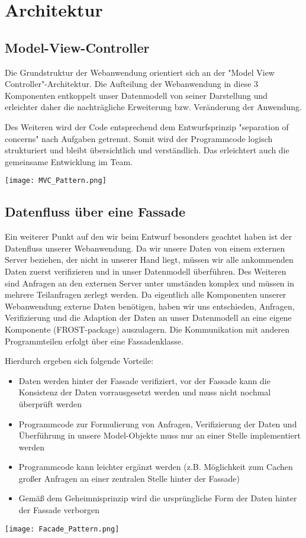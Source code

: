 \section{Architektur}

\subsection{Model-View-Controller}
Die Grundstruktur der Webanwendung orientiert sich an der "Model View Controller"-Architektur. Die Aufteilung der Webanwendung in diese 3 Komponenten entkoppelt unser Datenmodell von seiner Darstellung und erleichter daher die nachträgliche Erweiterung bzw. Veränderung der Anwendung.

Des Weiteren wird der Code entsprechend dem Entwurfsprinzip "separation of concerns" nach Aufgaben getrennt. Somit wird der Programmcode logisch strukturiert und bleibt übersichtlich und verständlich. Das erleichtert auch die gemeinsame Entwicklung im Team.

\vspace{5mm}

\texttt{[image: MVC\_Pattern.png]}

\newpage

\subsection{Datenfluss über eine Fassade}
Ein weiterer Punkt auf den wir beim Entwurf besonders geachtet haben ist der Datenfluss unserer Webanwendung. Da wir unsere Daten von einem externen Server beziehen, der nicht in unserer Hand liegt, müssen wir alle ankommenden Daten zuerst verifizieren und in unser Datenmodell überführen. Des Weiteren sind Anfragen an den externen Server unter umständen komplex und müssen in mehrere Teilanfragen zerlegt werden.
Da eigentlich alle Komponenten unserer Webanwendung externe Daten benötigen, haben wir uns entschieden, Anfragen, Verifizierung und die Adaption der Daten an unser Datenmodell an eine eigene Komponente (FROST-package) auszulagern. Die Kommunikation mit anderen Programmteilen erfolgt über eine Fassadenklasse.

Hierdurch ergeben sich folgende Vorteile:
\begin{itemize}
    \item Daten werden hinter der Fassade verifiziert, vor der Fassade kann die Konsistenz der Daten vorrausgesetzt werden und muss nicht nochmal überprüft werden
    \item Programmcode zur Formulierung von Anfragen, Verifizierung der Daten und Überführung in unsere Model-Objekte muss nur an einer Stelle implementiert werden
    \item Programmcode kann leichter ergänzt werden (z.B. Möglichkeit zum Cachen großer Anfragen an einer zentralen Stelle hinter der Fassade)
    \item Gemäß dem Geheimnisprinzip wird die ursprüngliche Form der Daten hinter der Fassade verborgen
\end{itemize}

\vspace{5mm}

\texttt{[image: Facade\_Pattern.png]}
